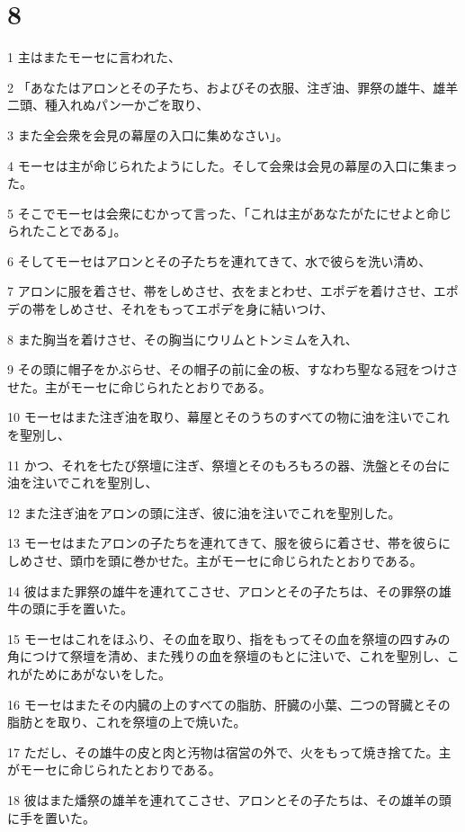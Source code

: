 \chapter{8}

\par 1 主はまたモーセに言われた、
\par 2 「あなたはアロンとその子たち、およびその衣服、注ぎ油、罪祭の雄牛、雄羊二頭、種入れぬパン一かごを取り、
\par 3 また全会衆を会見の幕屋の入口に集めなさい」。
\par 4 モーセは主が命じられたようにした。そして会衆は会見の幕屋の入口に集まった。
\par 5 そこでモーセは会衆にむかって言った、「これは主があなたがたにせよと命じられたことである」。
\par 6 そしてモーセはアロンとその子たちを連れてきて、水で彼らを洗い清め、
\par 7 アロンに服を着させ、帯をしめさせ、衣をまとわせ、エポデを着けさせ、エポデの帯をしめさせ、それをもってエポデを身に結いつけ、
\par 8 また胸当を着けさせ、その胸当にウリムとトンミムを入れ、
\par 9 その頭に帽子をかぶらせ、その帽子の前に金の板、すなわち聖なる冠をつけさせた。主がモーセに命じられたとおりである。
\par 10 モーセはまた注ぎ油を取り、幕屋とそのうちのすべての物に油を注いでこれを聖別し、
\par 11 かつ、それを七たび祭壇に注ぎ、祭壇とそのもろもろの器、洗盤とその台に油を注いでこれを聖別し、
\par 12 また注ぎ油をアロンの頭に注ぎ、彼に油を注いでこれを聖別した。
\par 13 モーセはまたアロンの子たちを連れてきて、服を彼らに着させ、帯を彼らにしめさせ、頭巾を頭に巻かせた。主がモーセに命じられたとおりである。
\par 14 彼はまた罪祭の雄牛を連れてこさせ、アロンとその子たちは、その罪祭の雄牛の頭に手を置いた。
\par 15 モーセはこれをほふり、その血を取り、指をもってその血を祭壇の四すみの角につけて祭壇を清め、また残りの血を祭壇のもとに注いで、これを聖別し、これがためにあがないをした。
\par 16 モーセはまたその内臓の上のすべての脂肪、肝臓の小葉、二つの腎臓とその脂肪とを取り、これを祭壇の上で焼いた。
\par 17 ただし、その雄牛の皮と肉と汚物は宿営の外で、火をもって焼き捨てた。主がモーセに命じられたとおりである。
\par 18 彼はまた燔祭の雄羊を連れてこさせ、アロンとその子たちは、その雄羊の頭に手を置いた。
